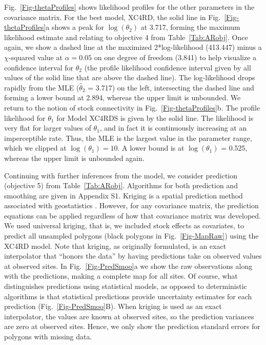 \documentclass[11pt, titlepage]{article}\usepackage[]{graphicx}\usepackage[]{color}
\begin{document}
\begin{spacing}{1.9}
\begin{flushleft}
Fig.~\ref{Fig-thetaProfiles} shows likelihood profiles for the other parameters in the covariance matrix.  For the best model, XC4RD, the solid line in Fig.~\ref{Fig-thetaProfiles}a shows a peak for $\log(\theta_2)$ at 3.717, forming the maximum likelihood estimate and relating to objective 4 from Table~\ref{Tab:ARobj}. Once again, we show a dashed line at the maximized 2*log-likelihood (413.447) minus a $\chi$-squared value at $\alpha = 0.05$ on one degree of freedom (3.841) to help visualize a confidence interval for $\theta_2$ (the profile likelihood confidence interval given by all values of the solid line that are above the dashed line). The log-likelihood drops rapidly from the MLE ($\hat{\theta}_2$ = 3.717) on the left, intersecting the dashed line and forming a lower bound at 2.894, whereas the upper limit is unbounded. We return to the notion of stock connectivity in Fig.~\ref{Fig-thetaProfiles}b.  The profile likelihood for $\theta_1$ for Model XC4RDS is given by the solid line. The likelihood is very flat for larger values of $\theta_1$, and in fact it is continuously increasing at an imperceptible rate. Thus, the MLE is the largest value in the parameter range, which we clipped at $\log(\theta_1) = 10$. A lower bound is at $\log(\theta_1)$ = 0.525, whereas the upper limit is unbounded again.

Continuing with further inferences from the model, we consider prediction (objective 5) from Table~\ref{Tab:ARobj}. Algorithms for both prediction and smoothing are given in Appendix S1.  Kriging is a spatial prediction method associated with geostatistics \citep{Cres:orig:1990}.  However, for any covariance matrix, the prediction equations can be applied regardless of how that covariance matrix was developed.  We used universal kriging, that is, we included stock effects as covariates, \citep[][pg. 151]{Huij:Math:univ:1971,Cres:stat:1993} to predict all unsampled polygons (black polygons in Fig.~\ref{Fig-MapRaw}) using the XC4RD model. Note that kriging, as originally formulated, is an exact interpolator \citep[pg. 129]{Cres:stat:1993} that ``honors the data'' \citep[p. 252]{Scha:Gotw:stat:2005} by having predictions take on observed values at observed sites.  In Fig.~\ref{Fig-PredSmoo}a we show the raw observations along with the predictions, making a complete map for all sites. Of course, what distinguishes predictions using statistical models, as opposed to deterministic algorithms \citep[e.g., inverse distance weighting,][]{Shep:two:1968} is that statistical predictions provide uncertainty estimates for each prediction (Fig.~\ref{Fig-PredSmoo}B).  When kriging is used as an exact interpolator, the values are known at observed sites, so the prediction variances are zero at observed sites.  Hence, we only show the prediction standard errors for polygons with missing data.  


\end{flushleft}
\end{spacing}
\end{document}
